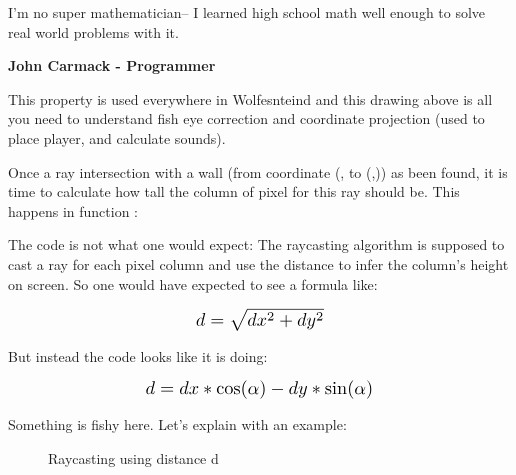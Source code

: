  \begin{fancyquotes}
  I'm no super mathematician-- I learned high school math well enough to solve real world problems with it.\\
 \par
\textbf{John Carmack - Programmer}
 \end{fancyquotes}


\par
\begin{figure}[H]
\centering
 
\end{figure}



This property is used everywhere in Wolfesnteind and this drawing above is all you need to understand fish eye correction and coordinate projection (used to place player, and calculate sounds).

\par
Once a ray intersection with a wall (from coordinate (, to (,)) as been found, it is time to calculate how tall the column of pixel for this ray should be. This happens in function :\\

\begin{minipage}{\textwidth}

\end{minipage}

The code is not what one would expect: The raycasting algorithm is supposed to cast a ray for each pixel column and use the distance  to infer the column's height on screen. So one would have expected to see a formula like:
\begin{figure}[H]
  \centering
  \begin{equation*}
    \scalebox{1.3}{
$ d = \sqrt{dx^2 + dy^2}$ 
 }
  \end{equation*}
\end{figure}
But instead the code looks like it is doing: 
\begin{figure}[H]
  \centering
  \begin{equation*}
    \scalebox{1.3}{
$d = dx * \cos(\alpha) - dy * \sin(\alpha) $
 }
  \end{equation*}
\end{figure}
Something is fishy here. Let's explain with an example:\\
\par
\begin{figure}[H]
\centering
 
 \caption{Raycasting using distance d} \label{fig:Raycasting2}
\end{figure}

